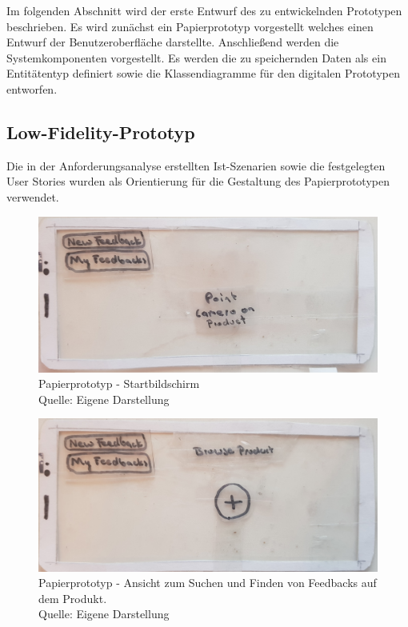 Im folgenden Abschnitt wird der erste Entwurf des zu entwickelnden Prototypen beschrieben. Es wird zunächst ein Papierprototyp vorgestellt welches einen Entwurf der Benutzeroberfläche darstellte. 
Anschließend werden die Systemkomponenten vorgestellt. Es werden die zu speichernden Daten als ein Entitätentyp definiert sowie die Klassendiagramme für den digitalen Prototypen entworfen.  

\subsection{Low-Fidelity-Prototyp}

Die in der Anforderungsanalyse erstellten Ist-Szenarien sowie die festgelegten User Stories wurden als Orientierung für die Gestaltung des Papierprototypen verwendet. 

\begin{figure}[H]
	\centering
	\includegraphics[width=.7\textwidth]{resources/conception/lowfi_startbildschirm.jpg}
	\caption{Papierprototyp - Startbildschirm  \\Quelle: Eigene Darstellung}
	\label{img:sysstem_sketch}
\end{figure}

\begin{figure}[H]
	\centering
	\includegraphics[width=.7\textwidth]{resources/conception/lowfi_browseOnProduct.jpg}
	\caption{Papierprototyp - Ansicht zum Suchen und Finden von Feedbacks auf dem Produkt. \\Quelle: Eigene Darstellung}
	\label{img:sysstem_sketch}
\end{figure}


